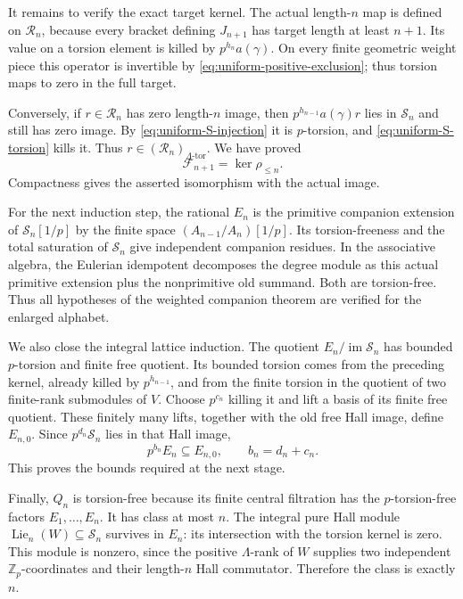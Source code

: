 It remains to verify the exact target kernel.
The actual length-\(n\) map is defined on \(\mathcal R_n\),
because every bracket defining \(J_{n+1}\) has target
length at least \(n+1\).  Its value on a torsion element
is killed by \(p^{h_n}a(\gamma)\).
On every finite geometric weight piece this operator
is invertible by \eqref{eq:uniform-positive-exclusion};
thus torsion maps to zero in the full target.

Conversely, if \(r\in \mathcal R_n\) has zero length-\(n\) image,
then \(p^{h_{n-1}}a(\gamma)r\) lies in \(\mathcal S_n\) and
still has zero image.  By
\eqref{eq:uniform-S-injection} it is \(p\)-torsion,
and \eqref{eq:uniform-S-torsion} kills it.  Thus
\(r\in(\mathcal R_n)_{\Lambda\text{-tor}}\).
We have proved
\[
                    \mathcal F_{n+1}=\ker\rho_{\leq n}.
\]
Compactness gives the asserted isomorphism with the
actual image.

For the next induction step, the rational \(E_n\) is
the primitive companion extension of
\(\mathcal S_n[1/p]\) by the finite space
\((A_{n-1}/A_n)[1/p]\).
Its torsion-freeness and the total saturation of \(\mathcal S_n\)
give independent companion residues.  In the associative
algebra, the Eulerian idempotent decomposes the degree
module as this actual primitive extension plus the
nonprimitive old summand.  Both are torsion-free.
Thus all hypotheses of the weighted companion theorem
are verified for the enlarged alphabet.

We also close the integral lattice induction.
The quotient \(E_n/\operatorname{im}\mathcal S_n\) has bounded
\(p\)-torsion and finite free quotient.  Its bounded
torsion comes from the preceding kernel, already killed
by \(p^{h_{n-1}}\), and from the finite torsion in the
quotient of two finite-rank submodules of \(V\).
Choose \(p^{c_n}\) killing it and lift a basis of its
finite free quotient.  These finitely many lifts,
together with the old free Hall image, define
\(E_{n,0}\).  Since \(p^{d_n}\mathcal S_n\) lies in that Hall
image,
\[
                 p^{b_n}E_n\subseteq E_{n,0},
                 \qquad b_n=d_n+c_n.
\]
This proves the bounds required at the next stage.

Finally, \(Q_n\) is torsion-free because its finite
central filtration has the \(p\)-torsion-free factors
\(E_1,\ldots,E_n\).  It has class at most \(n\).
The integral pure Hall module
\(\operatorname{Lie}_n(W)\subseteq \mathcal S_n\) survives
in \(E_n\): its intersection with the torsion kernel
is zero.  This module is nonzero, since the positive
\(\Lambda\)-rank of \(W\) supplies two independent
\(\mathbb Z_p\)-coordinates and their length-\(n\)
Hall commutator.  Therefore the class is exactly \(n\).

